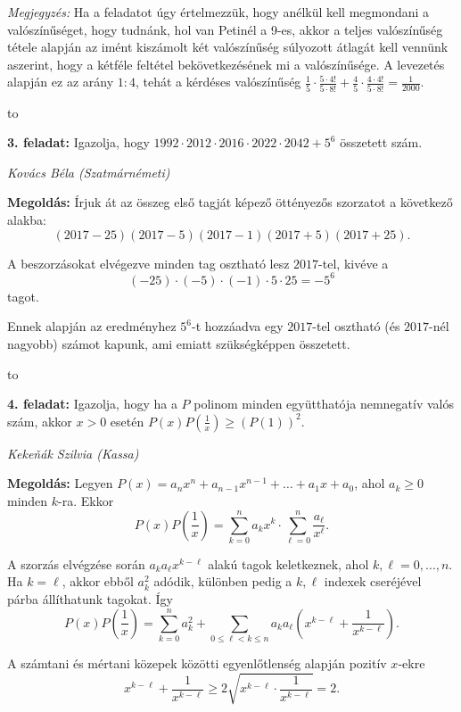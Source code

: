 \documentclass[a4paper,10pt]{article}
\newcommand{\ki}[2]{\hfill {\it #1 (#2)}\medskip}
\newcommand{\vonal}{\hbox to \hsize{\hskip2truecm\hrulefill\hskip2truecm}}
\begin{document}
\medskip
\noindent \emph{Megjegyzés:} Ha a feladatot úgy értelmezzük, hogy anélkül kell megmondani a
valószínűséget, hogy tudnánk, hol van Petinél a 9-es, akkor a teljes valószínűség tétele alapján az imént kiszámolt
két valószínűség súlyozott átlagát kell vennünk aszerint, hogy a kétféle
feltétel bekövetkezésének mi a valószínűsége. A levezetés alapján ez az
arány $1:4$, tehát a kérdéses valószínűség  $\displaystyle
\frac{1}{5}\cdot\frac{5\cdot4!}{5\cdot8!}+\frac{4}{5}\cdot
\frac{4\cdot4!}{5\cdot8!}=\frac{1}{2000}$.

\vonal

{\bf 3. feladat: } Igazolja, hogy
$1992\cdot2012\cdot2016\cdot2022\cdot2042+5^6$ összetett szám.

\ki{Kovács Béla}{Szatmárnémeti}\medskip

{\bf Megoldás:} Írjuk át az összeg első tagját képező
öttényezős szorzatot a következő alakba:
\[(2017-25)(2017-5)(2017-1)(2017+5)(2017+25).\]

\noindent A beszorzásokat elvégezve minden tag osztható lesz $2017$-tel, kivéve a
\[(-25)\cdot(-5)\cdot(-1)\cdot5\cdot25=-5^6\] 
tagot.

\smallskip

\noindent Ennek alapján az eredményhez $5^6$-t hozzáadva egy $2017$-tel osztható (és
$2017$-nél nagyobb) számot kapunk, ami emiatt szükségképpen összetett.

\vonal

{\bf 4. feladat: } Igazolja, hogy ha a $P$ polinom minden együtthatója nemnegatív valós szám, akkor $x>0$ esetén $P(x)P(\frac1x)\geq (P(1))^2$.

\ki{Keke\v{n}ák Szilvia}{Kassa}\medskip

{\bf Megoldás: }
Legyen $P(x)=a_nx^n+a_{n-1}x^{n-1}+\ldots+a_1x+a_0$, ahol $a_k\geq0$ minden $k$-ra. Ekkor
\[P(x)P\left(\frac1x\right)=\sum_{k=0}^na_kx^k\cdot\sum_{\ell=0}^n\frac{a_\ell}{x^\ell}.\]

\noindent A szorzás elvégzése során $a_ka_\ell x^{k-\ell}$ alakú tagok keletkeznek, ahol $k,\ell=0,\ldots,n$. Ha $k=\ell$, akkor ebből $a_k^2$ adódik, különben pedig a $k, \ell$ indexek cseréjével párba állíthatunk tagokat. Így
\[P(x)P\left(\frac1x\right)=\sum_{k=0}^na_k^2+\sum_{0\leq \ell<k\leq n}a_ka_\ell\left(x^{k-\ell}+\frac1{x^{k-\ell}}\right).\]

\noindent A számtani és mértani közepek közötti egyenlőtlenség alapján pozitív $x$-ekre
\[x^{k-\ell}+\frac1{x^{k-\ell}}\geq2\sqrt{x^{k-\ell}\cdot \frac1{x^{k-\ell}}}=2.\]
\end{document}
